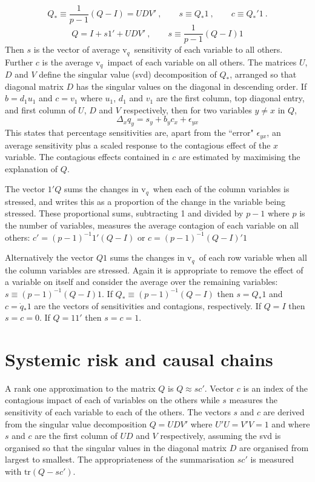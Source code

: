\documentclass[authoryear]{elsarticle}
\newcommand{\eps}{\epsilon}
\newcommand{\tr}{\mathrm{tr}}
\renewcommand{\v}{\ensuremath{\mathrm{v}_q}}
\newcommand{\cq}{\ , \qquad}
\begin{document}
$$
Q_* \equiv \frac{1}{p-1}(Q-I)=UDV'\cq s\equiv Q_*1\cq c\equiv Q_*'1\ .
$$$$
Q=I + s1'+ UDV'\cq s\equiv \frac{1}{p-1}(Q-I)1
$$
Then $s$ is the vector of average \v\ sensitivity of each variable to all others.  Further $c$ is the average \v\ impact of each variable on all others.   The matrices $U$, $D$ and $V$ define the singular value (svd) decomposition of $Q_*$, arranged so that diagonal matrix $D$ has the singular values on  the diagonal in descending order.   If $b=d_1u_1$ and $c=v_1$ where $u_1$, $d_1$ and $v_1$ are the first column, top diagonal entry, and first column of $U$, $D$ and $V$ respectively, then  for two variables $y\ne x$ in $Q$,
$$
\Delta_x q_y = s_y+ b_yc_x +\eps_{yx}
$$
This states that percentage sensitivities are, apart from the ``error" $\eps_{yx}$, an average sensitivity plus a scaled response to the contagious effect of the $x$ variable.   The contagious effects contained in $c$ are estimated by maximising the explanation of $Q$.


The vector $1'Q$ sums  the changes in \v\ when each of the column variables is stressed, and writes this as a proportion of the change in the variable being stressed.   These proportional sums, subtracting 1 and divided by  $p-1$ where $p$ is the number of variables, measures the average contagion of each variable on all others:  $c'=(p-1)^{-1}1'(Q-I)$ or $c=(p-1)^{-1}(Q-I)'1$

Alternatively the vector $Q1$ sums the changes in \v\ of each row variable when all the column variables are stressed.   Again it is appropriate to remove the effect of a variable on itself and consider the average over the remaining variables:  $s\equiv(p-1)^{-1}(Q-I)1$.  If $Q_*\equiv (p-1)^{-1}(Q-I)$ then $s=Q_*1$ and $c=\dot q_*1$ are the vectors of sensitivities and contagions, respectively.  If $Q=I$ then $s=c=0$.   If $Q=11'$ then $s=c=1$.



 
 \section{Systemic risk and causal chains}
A rank one approximation to the matrix  $Q$ is 
 $
 Q  \approx  sc' 
 $.
 Vector $c$ is an index of the contagious  impact of each of variables on the others while $s$ measures the sensitivity of each variable to each of the others.  The vectors $s$ and $c$ are derived from the singular value decomposition $Q=UDV'$ where $U'U=V'V=1$  and  where $s$ and $c$ are the first column of $UD$ and $V$  respectively, assuming the svd is organised so that the singular values in the diagonal matrix $D$ are organised from largest to smallest.   The appropriateness of the summarisation $sc'$ is measured with $\tr(Q-sc')$.
 
\end{document}

